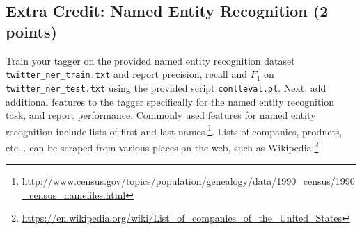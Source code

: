 \documentclass[12pt, letterpaper]{article}
\begin{document}
\subsection*{Extra Credit: Named Entity Recognition (2 points)}
Train your tagger on the provided named entity recognition dataset {\tt twitter\_ner\_train.txt} and report
precision, recall and $F_1$ on {\tt twitter\_ner\_test.txt} using the provided script {\tt conlleval.pl}.
Next, add additional features to the tagger specifically for the named entity recognition task, and report performance.
Commonly used features for named entity recognition include lists of first and last names.\footnote{\url{http://www.census.gov/topics/population/genealogy/data/1990\_census/1990\_census\_namefiles.html}}.
Lists of companies, products, etc... can be scraped from various places on the web, such as Wikipedia.\footnote{\url{https://en.wikipedia.org/wiki/List\_of\_companies\_of\_the\_United\_States}}.
\end{document}
